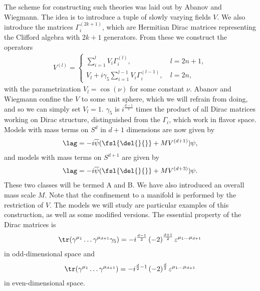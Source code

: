 The scheme for constructing such theories was laid out by Abanov and Wiegmann. The idea is to introduce a tuple of slowly varying fields $V$. We also introduce the matrices $\Gamma_{i}^{(2k + 1)}$, which are Hermitian Dirac matrices representing the Clifford algebra with $2k + 1$ generators. From these we construct the operators
\begin{align*}
	V^{(l)} = \begin{cases}
		\sum\limits_{i = 1}^{l}V_{i}\Gamma^{(l)}_{i},\ &l = 2n + 1, \\
		V_{l} + i\gamma_{5}\sum\limits_{i = 1}^{l - 1}V_{i}\Gamma^{(l - 1)}_{i},\ &l = 2n,
	\end{cases}
\end{align*}
with the parametrization $V_{l} = \cos(\nu)$ for some constant $\nu$. Abanov and Wiegmann confine the $V$ to some unit sphere, which we will refrain from doing, and so we can simply set $V_{l} = 1$. $\gamma_{5}$ is $i^{\frac{d - 1}{2}}$ times the product of all Dirac matrices working on Dirac structure, distinguished from the $\Gamma_{i}$, which work in flavor space. Models with mass terms on $S^{d}$ in $d + 1$ dimensions are now given by
\begin{align*}
	\lag = -i\overline{\psi}(\fsl{\del{}{}} + MV^{(d + 1)})\psi,
\end{align*}
and models with mass terms on $S^{d + 1}$ are given by
\begin{align*}
	\lag = -i\overline{\psi}(\fsl{\del{}{}} + MV^{(d + 3)})\psi.
\end{align*}
These two classes will be termed A and B. We have also introduced an overall mass scale $M$. Note that the confinement to a manifold is performed by the restriction of $V$. The models we will study are particular examples of this construction, as well as some modified versions. The essential property of the Dirac matrices is
\begin{align*}
	\tr(\gamma^{\mu_{1}}\dots\gamma^{\mu_{d + 1}}\gamma_{5}) = -i^{\frac{d - 1}{2}}\left(-2\right)^{\frac{d + 1}{2}}\varepsilon^{\mu_{1}\dots\mu_{d + 1}}
\end{align*}
in odd-dimensional space and
\begin{align*}
	\tr(\gamma^{\mu_{1}}\dots\gamma^{\mu_{d + 1}}) =  -i^{\frac{d}{2} - 1}\left(-2\right)^{\frac{d}{2}}\varepsilon^{\mu_{1}\dots\mu_{d + 1}}
\end{align*}
in even-dimensional space.

